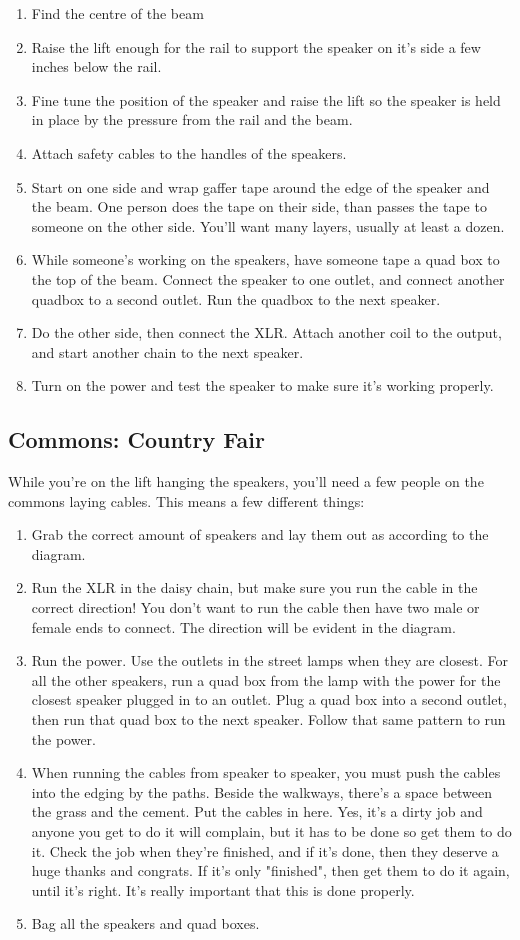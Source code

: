 \documentclass[11pt,a4paper]{book}
\begin{document}
\begin{enumerate}
\item Find the centre of the beam
\item Raise the lift enough for the rail to support the speaker on it's side a few inches below the rail.
\item Fine tune the position of the speaker and raise the lift so the speaker is held in place by the pressure from the rail and the beam.
\item Attach safety cables to the handles of the speakers.
\item Start on one side and wrap gaffer tape around the edge of the speaker and the beam. One person does the tape on their side, than passes the tape to someone on the other side. You'll want many layers, usually at least a dozen.
\item While someone's working on the speakers, have someone tape a quad box to the top of the beam. Connect the speaker to one outlet, and connect another quadbox to a second outlet. Run the quadbox to the next speaker.
\item Do the other side, then connect the XLR. Attach another coil to the output, and start another chain to the next speaker.
\item Turn on the power and test the speaker to make sure it's working properly.
\end{enumerate}
\subsection{Commons: Country Fair}
While you're on the lift hanging the speakers, you'll need a few people on the commons laying cables. This means a few different things:
\begin{enumerate}
\item Grab the correct amount of speakers and lay them out as according to the diagram. 
\item Run the XLR in the daisy chain, but make sure you run the cable in the correct direction! You don't want to run the cable then have two male or female ends to connect. The direction will be evident in the diagram.
\item Run the power. Use the outlets in the street lamps when they are closest. For all the other speakers, run a quad box from the lamp with the power for the closest speaker plugged in to an outlet. Plug a quad box into a second outlet, then run that quad box to the next speaker. Follow that same pattern to run the power.
\item When running the cables from speaker to speaker, you must push the cables into the edging by the paths. Beside the walkways, there's a space between the grass and the cement. Put the cables in here. Yes, it's a dirty job and anyone you get to do it will complain, but it has to be done so get them to do it. Check the job when they're finished, and if it's done, then they deserve a huge thanks and congrats. If it's only "finished", then get them to do it again, until it's right. It's really important that this is done properly.
\item Bag all the speakers and quad boxes.
\end{enumerate}
\end{document}
